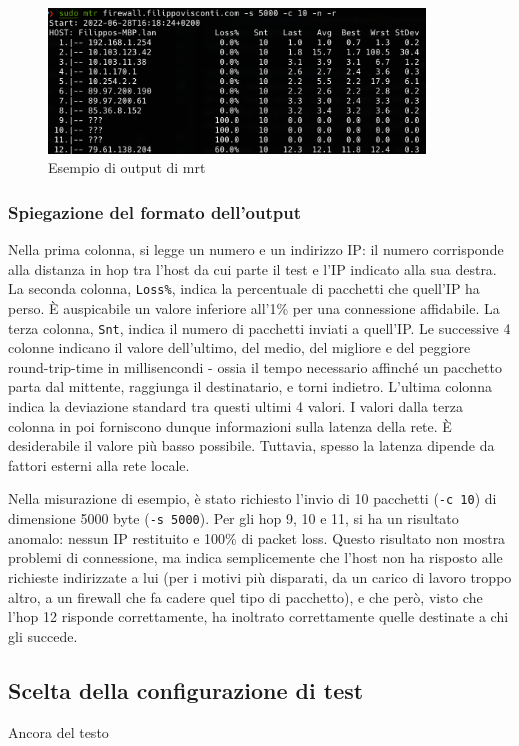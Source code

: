 \begin{figure}[ht]
    \centering
    \includegraphics[width=10cm]{figure/mtrSample.png}
    \caption{Esempio di output di mrt}
\end{figure}

\subsubsection{Spiegazione del formato dell'output}
Nella prima colonna, si legge un numero e un indirizzo IP: il numero corrisponde alla distanza in hop tra l'host da cui parte il test e l'IP indicato alla sua destra.
La seconda colonna, \texttt{Loss\%}, indica la percentuale di pacchetti che quell'IP ha perso. È auspicabile un valore inferiore all'1\% per una connessione affidabile.
La terza colonna, \texttt{Snt}, indica il numero di pacchetti inviati a quell'IP.
Le successive 4 colonne indicano il valore dell'ultimo, del medio, del migliore e del peggiore round-trip-time in millisencondi - ossia il tempo necessario affinché un pacchetto parta dal mittente, raggiunga il destinatario, e torni indietro.
L'ultima colonna indica la deviazione standard tra questi ultimi 4 valori.
I valori dalla terza colonna in poi forniscono dunque informazioni sulla latenza della rete. È desiderabile il valore più basso possibile. Tuttavia,  spesso la latenza dipende da fattori esterni alla rete locale.

Nella misurazione di esempio, è stato richiesto l'invio di 10 pacchetti (\texttt{-c 10}) di dimensione 5000 byte (\texttt{-s 5000}).
Per gli hop 9, 10 e 11, si ha un risultato anomalo: nessun IP restituito e 100\% di packet loss.
Questo risultato non mostra problemi di connessione, ma indica semplicemente che l'host non ha risposto alle richieste indirizzate a lui (per i motivi più disparati, da un carico di lavoro troppo altro, a un firewall che fa cadere quel tipo di pacchetto), e che però, visto che l'hop 12 risponde correttamente, ha inoltrato correttamente quelle destinate a chi gli succede.



\subsection{Scelta della configurazione di test}
Ancora del testo

